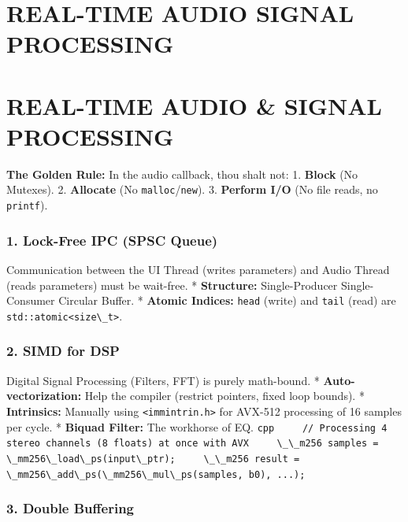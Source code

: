 \hypertarget{real-time-audio-signal-processing}{%
\chapter{REAL-TIME AUDIO SIGNAL
PROCESSING}\label{real-time-audio-signal-processing}}

\hypertarget{real-time-audio-signal-processing-1}{%
\chapter{REAL-TIME AUDIO \& SIGNAL
PROCESSING}\label{real-time-audio-signal-processing-1}}

\textbf{The Golden Rule:} In the audio callback, thou shalt not: 1.
\textbf{Block} (No Mutexes). 2. \textbf{Allocate} (No
\passthrough{\lstinline!malloc!}/\passthrough{\lstinline!new!}). 3.
\textbf{Perform I/O} (No file reads, no
\passthrough{\lstinline!printf!}).

\hypertarget{lock-free-ipc-spsc-queue}{%
\subsection{1. Lock-Free IPC (SPSC
Queue)}\label{lock-free-ipc-spsc-queue}}

Communication between the UI Thread (writes parameters) and Audio Thread
(reads parameters) must be wait-free. * \textbf{Structure:}
Single-Producer Single-Consumer Circular Buffer. * \textbf{Atomic
Indices:} \passthrough{\lstinline!head!} (write) and
\passthrough{\lstinline!tail!} (read) are
\passthrough{\lstinline!std::atomic<size\_t>!}.

\hypertarget{simd-for-dsp}{%
\subsection{2. SIMD for DSP}\label{simd-for-dsp}}

Digital Signal Processing (Filters, FFT) is purely math-bound. *
\textbf{Auto-vectorization:} Help the compiler (restrict pointers, fixed
loop bounds). * \textbf{Intrinsics:} Manually using
\passthrough{\lstinline!<immintrin.h>!} for AVX-512 processing of 16
samples per cycle. * \textbf{Biquad Filter:} The workhorse of EQ.
\passthrough{\lstinline!cpp     // Processing 4 stereo channels (8 floats) at once with AVX     \_\_m256 samples = \_mm256\_load\_ps(input\_ptr);     \_\_m256 result = \_mm256\_add\_ps(\_mm256\_mul\_ps(samples, b0), ...);!}

\hypertarget{double-buffering}{%
\subsection{3. Double Buffering}\label{double-buffering}}

